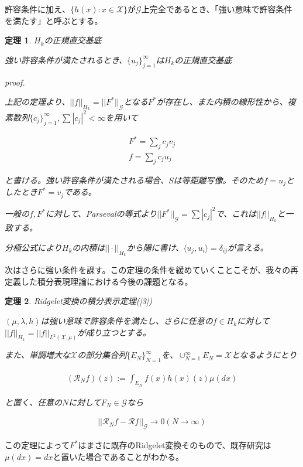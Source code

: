 \documentclass{jsarticle}
\newtheorem{theo}{定理}[section]
\begin{document}
許容条件に加え、$\{h(x):x\in\mathcal{X}\}$が$\mathcal{G}$上完全であるとき、「強い意味で許容条件を満たす」と呼ぶとする。

\begin{theo} $H_k$の正規直交基底

強い許容条件が満たされるとき、$\{u_j\}^\infty_{j=1}$は$H_k$の正規直交基底

proof.

上記の定理より、$||f||_{H_k}=||F^*||_\mathcal{G}$となる$F^*$が存在し、また内積の線形性から、複素数列$\{c_j\}^\infty_{j=1},\sum |c_j|^2<\infty$を用いて

\begin{align}
F^*=\sum_j c_j v_j\\
f=\sum_j c_j u_j
\end{align}

と書ける。強い許容条件が満たされる場合、$S$は等距離写像。そのため$f=u_j$としたとき$F^*=v_j$である。

一般の$f,F^*$に対して、Parsevalの等式より$||F^*||_\mathcal{G}=\sum |c_j|^2$で、これは$||f||_{H_k}$と一致する。

分極公式により$H_k$の内積は$||\cdot ||_{H_k}$から陽に書け、$\langle u_j ,u_i\rangle=\delta_{ij}$が言える。

\end{theo}

次はさらに強い条件を課す。この定理の条件を緩めていくことこそが、我々の再定義した積分表現理論における今後の課題となる。

\begin{theo} Ridgelet変換の積分表示定理([3])

$(\mu,\lambda,h)$は強い意味で許容条件を満たし、さらに任意の$f\in H_k$に対して$||f||_{H_k}=||f||_{L^2(\mathcal{X},\mu)}$が成り立つとする。

また、単調増大な$\mathcal{X}$の部分集合列$\{E_N\}^\infty_{N=1}$を、$\cup^\infty_{N=1} E_N=\mathcal{X}$となるようにとり

\begin{align}
(\mathcal{R}_Nf)(z):=\int_{E_N} f(x) \overline{h(x)(z)}\mu(dx)
\end{align}

と置く、任意の$N$に対して$F_N\in\mathcal{G}$なら

\begin{align}
||\mathcal{R}_Nf-\mathcal{R}f||_\mathcal{G}\to 0(N\to\infty) 
\end{align}
\end{theo}

この定理によって$F^*$はまさに既存のRidgelet変換そのもので、既存研究は$\mu(dx)=dx$と置いた場合であることがわかる。
\end{document}
